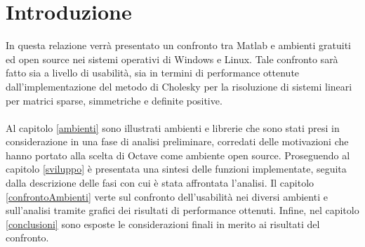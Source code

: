 \section{Introduzione}
In questa relazione verrà presentato un confronto tra Matlab e ambienti gratuiti ed open source nei sistemi operativi di Windows e Linux. Tale confronto sarà fatto sia a livello di usabilità, sia in termini di performance ottenute dall'implementazione del metodo di Cholesky per la risoluzione di sistemi lineari per matrici sparse, simmetriche e definite positive.
\\\\
Al capitolo \ref{ambienti} sono illustrati ambienti e librerie che sono stati presi in considerazione in una fase di analisi preliminare, corredati delle motivazioni che hanno portato alla scelta di Octave come ambiente open source. Proseguendo al capitolo \ref{sviluppo} è presentata una sintesi delle funzioni implementate, seguita dalla descrizione delle fasi con cui è stata affrontata l'analisi. Il capitolo \ref{confrontoAmbienti} verte sul confronto dell'usabilità nei diversi ambienti e sull'analisi tramite grafici dei risultati di performance ottenuti. Infine, nel capitolo \ref{conclusioni} sono esposte le considerazioni finali in merito ai risultati del confronto.